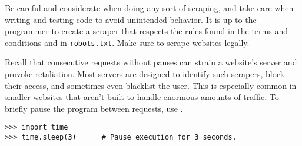 \begin{warn} %
Be careful and considerate when doing any sort of scraping, and take care when writing and testing code to avoid unintended behavior.
It is up to the programmer to create a scraper that respects the rules found in the terms and conditions and in \texttt{robots.txt}.
Make sure to scrape websites legally.
\end{warn}
\begin{comment} %
The standard way to get the HTML source code of a website using Python is via the \li{requests} library.\footnote{Though \texttt{requests} is not part of the standard library, it is recognized as a standard tool in the data science community. See \url{http://docs.python-requests.org/}.}
Calling \li{requests.get()} sends an HTTP GET request to a specified website; the result is an object with a response code that indicates whether or not the request was successful and if so, access to the website source code.

\begin{lstlisting}
>>> import requests

# Make a request and check the result. A status code of 200 is good.
>>> response = requests.get("http://www.example.com")
>>> print(response.status_code, response.ok, response.reason)
<<200 True OK>>

# The HTML of the website is stored in the 'text' attribute.
>>> print(response.text)
<<<!doctype html>
<html>
<head>
    <title>Example Domain</title>

    <meta charset="utf-8" />
    <meta http-equiv="Content-type" content="text/html; charset=utf-8" />>>
# ...
\end{lstlisting}
\end{comment}

Recall that consecutive requests without pauses can strain a website's server and provoke retaliation.
Most servers are designed to identify such scrapers, block their access, and sometimes even blacklist the user.
This is especially common in smaller websites that aren't built to handle enormous amounts of traffic.
To briefly pause the program between requests, use .
\begin{lstlisting}
>>> import time
>>> time.sleep(3)      # Pause execution for 3 seconds.
\end{lstlisting}


